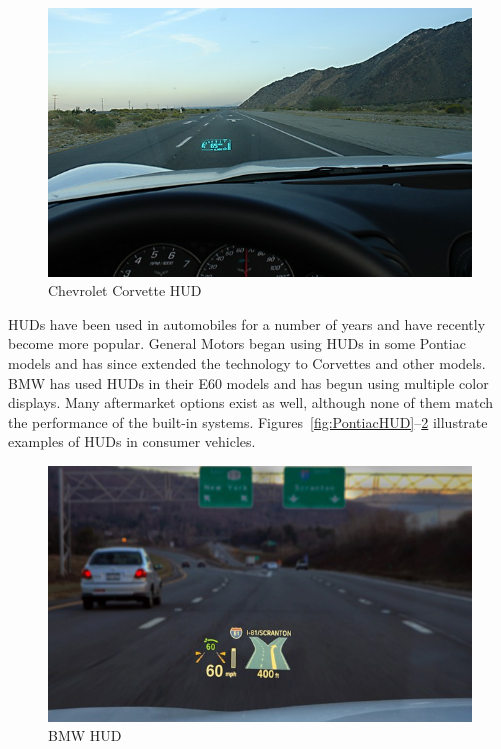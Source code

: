 \begin{figure}[h]
	\includegraphics[width=\textwidth]{img/CorvetteHUD.jpg}
	\caption{Chevrolet Corvette HUD}
	\label{fig:CorvetteHUD}
\end{figure}

HUDs have been used in automobiles for a number of years and have recently 
become more popular. General Motors began using HUDs in some Pontiac
models and has since extended the technology to Corvettes and other models.
BMW has used HUDs in their E60 models and has begun using multiple color
displays. Many aftermarket options exist as well, although none of them
match the performance of the built-in systems.
Figures~\ref{fig:PontiacHUD}--\ref{fig:BMWHUD} illustrate examples of HUDs
in consumer vehicles.


\begin{figure}[h]
	\includegraphics[width=\textwidth]{img/BMWHUD.jpg}
	\caption{BMW HUD}
	\label{fig:BMWHUD}
\end{figure}

